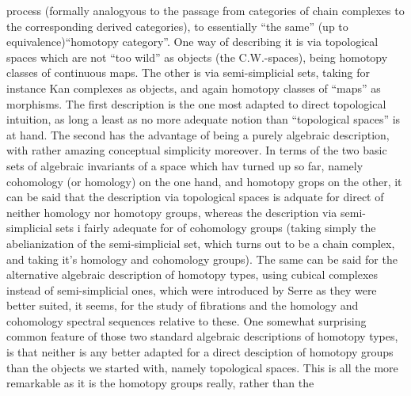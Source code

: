 process (formally analogyous to the passage from  categories of
chain complexes to the corresponding derived categories), to essentially
``the same'' (up to equivalence)\hand{|}``homotopy category''. One way of describing
it is via topological spaces which are not ``too wild'' as objects (the
C.W.-spaces),  being homotopy classes of continuous maps. The
other is via semi-simplicial sets, taking for instance Kan complexes as
objects, and again homotopy classes of ``maps'' as morphisms. The first
description is the one most adapted to direct topological intuition,
as long a least as no more adequate notion than ``topological spaces'' is
at hand. The second has the advantage of being a purely algebraic
description, with rather amazing conceptual simplicity moreover. In
terms of the two basic sets of algebraic invariants of a space which hav
turned up so far, namely cohomology (or homology) on the one hand, and
homotopy grops on the other, it can be said that the description via
topological spaces is adquate for direct  of neither homology
nor homotopy groups, whereas the description via semi-simplicial sets i
fairly adequate for  of cohomology groups (taking simply the
abelianization of the semi-simplicial set, which turns out to be a
chain complex, and taking it's homology and cohomology groups). The
same can be said for the alternative algebraic description of homotopy
types, using cubical complexes instead of semi-simplicial ones, which
were introduced by Serre\hand{,} as they were better suited, it seems, for the
study of fibrations and  the homology and cohomology spectral sequences
relative to these. One somewhat surprising common feature of those two
standard algebraic descriptions of homotopy types, is that neither is
any better adapted for a direct desciption of homotopy groups than the
objects we started with, namely topological spaces. This is all the
more remarkable as it is the homotopy groups really, rather than the
